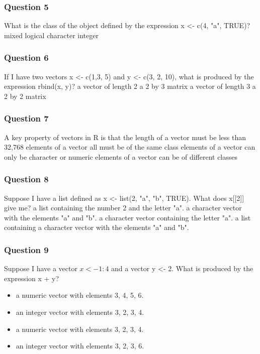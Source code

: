 \begin{frame}
\frametitle{Question 5}
\Large
What is the class of the object defined by the expression x <- c(4, "a", TRUE)?
mixed
logical
character
integer
\end{frame}
\begin{frame}
\frametitle{Question 6}
\Large
If I have two vectors x <- c(1,3, 5) and y <- c(3, 2, 10), what is produced by the expression rbind(x, y)?
a vector of length 2
a 2 by 3 matrix
a vector of length 3
a 2 by 2 matrix
\end{frame}
\begin{frame}
\frametitle{Question 7}
\Large
A key property of vectors in R is that
the length of a vector must be less than 32,768
elements of a vector all must be of the same class
elements of a vector can only be character or numeric
elements of a vector can be of different classes
\end{frame}
\begin{frame}
\frametitle{Question 8}
\Large
Suppose I have a list defined as x <- list(2, "a", "b", TRUE). What does x[[2]] give me?
a list containing the number 2 and the letter "a".
a character vector with the elements "a" and "b".
a character vector containing the letter "a".
a list containing a character vector with the elements "a" and "b".
\end{frame}
\begin{frame}
\frametitle{Question 9}
\Large
Suppose I have a vector $x <- 1:4$ and a vector y <- 2. What is produced by the expression x + y?
\begin{itemize}
\item a numeric vector with elements 3, 4, 5, 6.
\item an integer vector with elements 3, 2, 3, 4.
\item a numeric vector with elements 3, 2, 3, 4.
\item an integer vector with elements 3, 2, 3, 6.
\end{itemize}
\end{frame}
